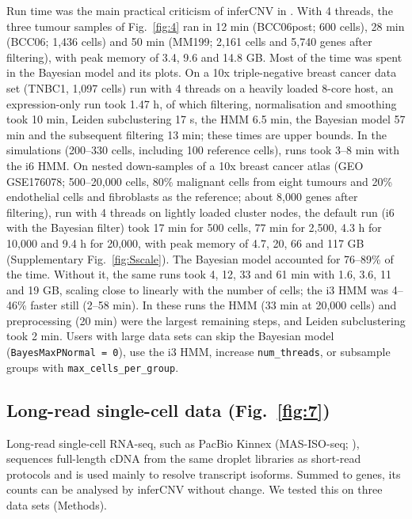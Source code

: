 Run time was the main practical criticism of inferCNV in \citet{schmid2025}. With 4 threads, the three tumour samples of Fig.~\ref{fig:4} ran in 12 min (BCC06post; 600 cells), 28 min (BCC06; 1,436 cells) and 50 min (MM199; 2,161 cells and 5,740 genes after filtering), with peak memory of 3.4, 9.6 and 14.8 GB. Most of the time was spent in the Bayesian model and its plots. On a 10x triple-negative breast cancer data set (TNBC1, 1,097 cells) run with 4 threads on a heavily loaded 8-core host, an expression-only run took 1.47 h, of which filtering, normalisation and smoothing took 10 min, Leiden subclustering 17 s, the HMM 6.5 min, the Bayesian model 57 min and the subsequent filtering 13 min; these times are upper bounds. In the simulations (200--330 cells, including 100 reference cells), runs took 3--8 min with the i6 HMM. On nested down-samples of a 10x breast cancer atlas \citep{wu2021breast} (GEO GSE176078; 500--20,000 cells, 80\% malignant cells from eight tumours and 20\% endothelial cells and fibroblasts as the reference; about 8,000 genes after filtering), run with 4 threads on lightly loaded cluster nodes, the default run (i6 with the Bayesian filter) took 17 min for 500 cells, 77 min for 2,500, 4.3 h for 10,000 and 9.4 h for 20,000, with peak memory of 4.7, 20, 66 and 117 GB (Supplementary Fig.~\ref{fig:Sscale}). The Bayesian model accounted for 76--89\% of the time. Without it, the same runs took 4, 12, 33 and 61 min with 1.6, 3.6, 11 and 19 GB, scaling close to linearly with the number of cells; the i3 HMM was 4--46\% faster still (2--58 min). In these runs the HMM (33 min at 20,000 cells) and preprocessing (20 min) were the largest remaining steps, and Leiden subclustering took 2 min. Users with large data sets can skip the Bayesian model (\texttt{BayesMaxPNormal\ =\ 0}), use the i3 HMM, increase \texttt{num\_threads}, or subsample groups with \texttt{max\_cells\_per\_group}.

\subsection{Long-read single-cell data (Fig.~\ref{fig:7})}

Long-read single-cell RNA-seq, such as PacBio Kinnex (MAS-ISO-seq; \citealp{alkhafaji2023masseq}), sequences full-length cDNA from the same droplet libraries as short-read protocols and is used mainly to resolve transcript isoforms. Summed to genes, its counts can be analysed by inferCNV without change. We tested this on three data sets (Methods).

